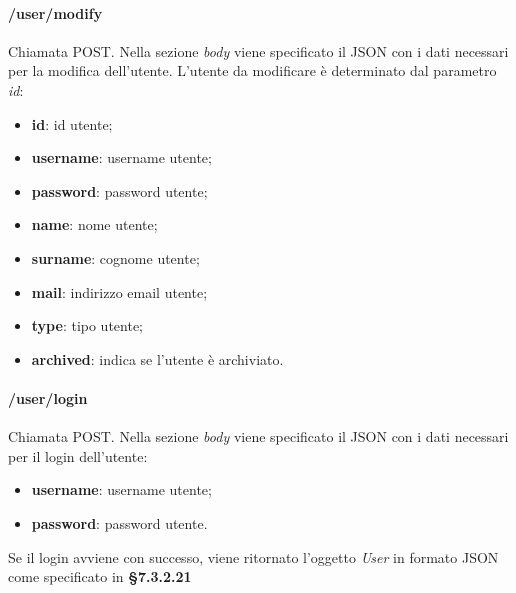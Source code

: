 \paragraph{/user/modify}
Chiamata POST. Nella sezione \textit{body} viene specificato il JSON con i dati necessari per la modifica dell'utente. L'utente da modificare è determinato dal parametro \textit{id}:
\begin{itemize}
	\item \textbf{id}: id utente;
	\item \textbf{username}: username utente;
	\item \textbf{password}: password utente;
	\item \textbf{name}: nome utente;
	\item \textbf{surname}: cognome utente;	
	\item \textbf{mail}: indirizzo email utente;	
	\item \textbf{type}: tipo utente;	
	\item \textbf{archived}: indica se l'utente è archiviato.	
\end{itemize}

\paragraph{/user/login}
Chiamata POST. Nella sezione \textit{body} viene specificato il JSON con i dati necessari per il login dell'utente:
\begin{itemize}
	\item \textbf{username}: username utente;
	\item \textbf{password}: password utente.	
\end{itemize}
Se il login avviene con successo, viene ritornato l'oggetto \textit{User} in formato JSON come specificato in \textbf{§7.3.2.21}
